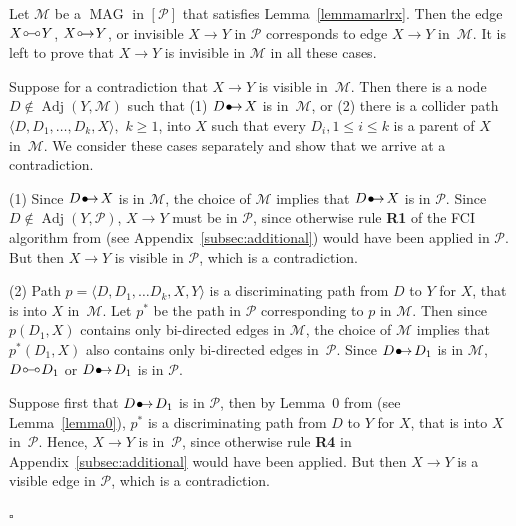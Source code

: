 \documentclass[11pt,a4paper]{article}
\newenvironment{proofof}[1][]{\begin{trivlist}
   \item[\hskip \labelsep {\bfseries Proof of #1.}]}{\hfill{}$\square$\end{trivlist}}
\DeclareMathOperator{\MAG}{MAG}
\DeclareMathOperator{\Adj}{Adj}
\newcommand{\g}[1][G]{\mathcal{#1}}
\newcommand{\pstar}[1][p]{{#1}^{*}}
\newcommand{\bulletarrow}{
  \setlength{\unitlength}{1mm}
  \begin{picture}(5,1)(0,0)
    \put(0.2,0){$\bullet$}
    \put(1,0){$\rightarrow$}
  \end{picture}
}
\newcommand{\circarrow}{
  \setlength{\unitlength}{1mm}
  \begin{picture}(5,1)(0,0)
    \put(1,1){\circle{1}}
    \put(1.2,0){$\rightarrow$}
  \end{picture}
}
\newcommand{\circcirc}{
  \setlength{\unitlength}{1mm}
  \begin{picture}(5,1)(0,0)
    \put(1,1){\circle{1}}
    \put(1.5,1){\line(1,0){2}}
    \put(4,1){\circle{1}}
  \end{picture}
}
\begin{document}
\begin{proofof}[Lemma~\ref{lemma:stays_invisible}]
Let $\g[M]$ be a $\MAG$ in $[\g[P]]$ that satisfies Lemma~\ref{lemmamarlrx}.
Then the edge $X \circcirc Y$, $X \circarrow Y$, or invisible $X \rightarrow Y$ in $\g[P]$ corresponds to edge $X \rightarrow Y$ in~$\g[M]$. It is left to prove that $X \rightarrow Y$ is invisible in $\g[M]$ in all these cases.

Suppose for a contradiction that $X \rightarrow Y$ is visible in~$\g[M]$. Then there is a node $D \notin \Adj(Y,\g[M])$ such that (1) $D \bulletarrow X$ is in~$\g[M]$, or (2) there is a collider path $\langle D,D_1,\dots,D_k,X \rangle,$ $k \ge 1$, into $X$ such that every $D_i, 1 \le i \le k$ is a parent of $X$ in~$\g[M]$.  We consider these cases separately and show that we arrive at a contradiction.

(1) Since $D \bulletarrow X$ is in $\g[M]$, the choice of $\g[M]$ implies that $D \bulletarrow X$ is in $\g[P]$. Since $D \notin \Adj(Y,\g[P])$,  $X \rightarrow Y$ must be in $\g[P]$, since otherwise rule \textbf{R1} of the FCI algorithm from \citet{spirtes2000causation} (see Appendix~\ref{subsec:additional}) would have been applied in $\g[P]$. But then $X \rightarrow Y$ is visible in $\g[P]$, which is a contradiction.

(2) Path $p = \langle D, D_1,\dots D_k, X, Y \rangle$ is a discriminating path from $D$ to $Y$ for $X$, that is into $X$ in~$\g[M]$. Let $\pstar$ be the path in $\g[P]$ corresponding to $p$ in $\g[M]$. Then since $p(D_1,X)$ contains only bi-directed edges in $\g[M]$, the choice of $\g[M]$ implies that $\pstar(D_1,X)$ also contains only bi-directed edges in~$\g[P]$.
Since $D \bulletarrow D_1$ is in $\g[M]$, $D \circcirc D_1$ or $D \bulletarrow D_1$ is in $\g[P]$.

Suppose first that $D \bulletarrow D_1$ is in $\g[P]$, then by Lemma~0 from \cite{zhang2006causal} (see Lemma~\ref{lemma0}), $\pstar$ is a discriminating path from $D$ to $Y$ for $X$, that is into $X$ in~$\g[P]$. Hence, $X \rightarrow Y$ is in~$\g[P]$, since otherwise rule \textbf{R4} in Appendix~\ref{subsec:additional} would have been applied. But then $X \rightarrow Y$ is a visible edge in $\g[P]$, which is a contradiction.


\end{proofof}
\end{document}
